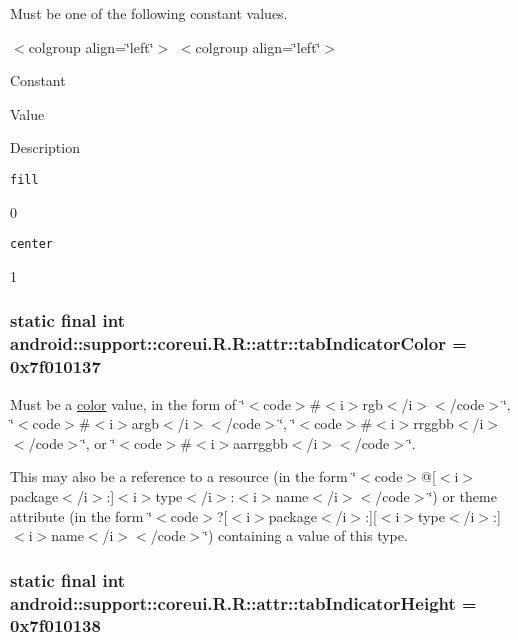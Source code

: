 Must be one of the following constant values. \begin{TabularC}{0}
\hline
\end{TabularC}
$<$colgroup align=\char`\"{}left\char`\"{}$>$ $<$colgroup align=\char`\"{}left\char`\"{}$>$ 

Constant

Value

Description 

{\tt fill}

0

{\tt center}

1\hypertarget{classandroid_1_1support_1_1coreui_1_1_r_1_1attr_6ce8db65e6dccddcf44d4f9954e6414b}{
\subsubsection[{tabIndicatorColor}]{\setlength{\rightskip}{0pt plus 5cm}static final int android::support::coreui.R.R::attr::tabIndicatorColor = 0x7f010137}}
\label{classandroid_1_1support_1_1coreui_1_1_r_1_1attr_6ce8db65e6dccddcf44d4f9954e6414b}


Must be a \hyperlink{classandroid_1_1support_1_1coreui_1_1_r_1_1color}{color} value, in the form of \char`\"{}$<$code$>$\#$<$i$>$rgb$<$/i$>$$<$/code$>$\char`\"{}, \char`\"{}$<$code$>$\#$<$i$>$argb$<$/i$>$$<$/code$>$\char`\"{}, \char`\"{}$<$code$>$\#$<$i$>$rrggbb$<$/i$>$$<$/code$>$\char`\"{}, or \char`\"{}$<$code$>$\#$<$i$>$aarrggbb$<$/i$>$$<$/code$>$\char`\"{}. 

This may also be a reference to a resource (in the form \char`\"{}$<$code$>$@\mbox{[}$<$i$>$package$<$/i$>$:\mbox{]}$<$i$>$type$<$/i$>$:$<$i$>$name$<$/i$>$$<$/code$>$\char`\"{}) or theme attribute (in the form \char`\"{}$<$code$>$?\mbox{[}$<$i$>$package$<$/i$>$:\mbox{]}\mbox{[}$<$i$>$type$<$/i$>$:\mbox{]}$<$i$>$name$<$/i$>$$<$/code$>$\char`\"{}) containing a value of this type. \hypertarget{classandroid_1_1support_1_1coreui_1_1_r_1_1attr_cefe30bf0b6c56b76e3c4bb7a38d1d2b}{
\subsubsection[{tabIndicatorHeight}]{\setlength{\rightskip}{0pt plus 5cm}static final int android::support::coreui.R.R::attr::tabIndicatorHeight = 0x7f010138}}
\label{classandroid_1_1support_1_1coreui_1_1_r_1_1attr_cefe30bf0b6c56b76e3c4bb7a38d1d2b}


